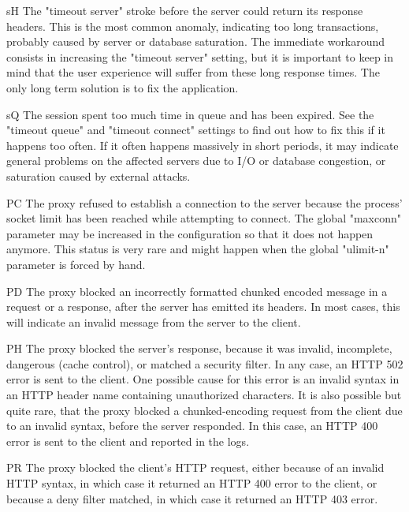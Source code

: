      sH   The "timeout server" stroke before the server could return its
          response headers. This is the most common anomaly, indicating too
          long transactions, probably caused by server or database saturation.
          The immediate workaround consists in increasing the "timeout server"
          setting, but it is important to keep in mind that the user experience
          will suffer from these long response times. The only long term
          solution is to fix the application.

     sQ   The session spent too much time in queue and has been expired. See
          the "timeout queue" and "timeout connect" settings to find out how to
          fix this if it happens too often. If it often happens massively in
          short periods, it may indicate general problems on the affected
          servers due to I/O or database congestion, or saturation caused by
          external attacks.

     PC   The proxy refused to establish a connection to the server because the
          process' socket limit has been reached while attempting to connect.
          The global "maxconn" parameter may be increased in the configuration
          so that it does not happen anymore. This status is very rare and
          might happen when the global "ulimit-n" parameter is forced by hand.

     PD   The proxy blocked an incorrectly formatted chunked encoded message in
          a request or a response, after the server has emitted its headers. In
          most cases, this will indicate an invalid message from the server to
          the client.

     PH   The proxy blocked the server's response, because it was invalid,
          incomplete, dangerous (cache control), or matched a security filter.
          In any case, an HTTP 502 error is sent to the client. One possible
          cause for this error is an invalid syntax in an HTTP header name
          containing unauthorized characters. It is also possible but quite
          rare, that the proxy blocked a chunked-encoding request from the
          client due to an invalid syntax, before the server responded. In this
          case, an HTTP 400 error is sent to the client and reported in the
          logs.

     PR   The proxy blocked the client's HTTP request, either because of an
          invalid HTTP syntax, in which case it returned an HTTP 400 error to
          the client, or because a deny filter matched, in which case it
          returned an HTTP 403 error.

